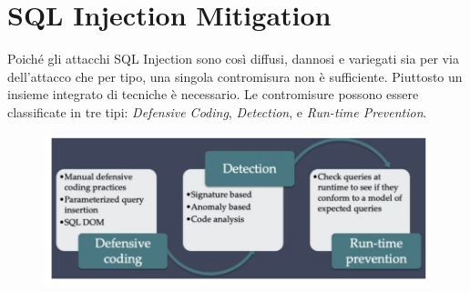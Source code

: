 \section{SQL Injection Mitigation}

Poiché gli attacchi SQL Injection sono così diffusi, dannosi e variegati sia per
via dell'attacco che per tipo, una singola contromisura non è sufficiente.
Piuttosto un insieme integrato di tecniche è necessario. Le contromisure possono
essere classificate in tre tipi: \textit{Defensive Coding}, \textit{Detection},
e \textit{Run-time Prevention}.

\begin{figure}[H]
    \centering
    \includegraphics[width=12cm, keepaspectratio]{capitoli/sql_security/imgs/sql2.png}
\end{figure}

